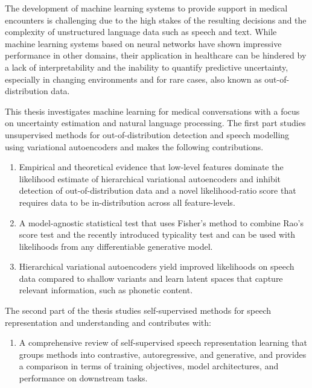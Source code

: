 The development of machine learning systems to provide support in medical encounters is challenging due to the high stakes of the resulting decisions and the complexity of unstructured language data such as speech and text. 
While machine learning systems based on neural networks have shown impressive performance in other domains, their application in healthcare can be hindered by a lack of interpretability and the inability to quantify predictive uncertainty, especially in changing environments and for rare cases, also known as out-of-distribution data.

This thesis investigates machine learning for medical conversations with a focus on uncertainty estimation and natural language processing. 
The first part studies unsupervised methods for out-of-distribution detection and speech modelling using variational autoencoders and makes the following contributions. 
%
\begin{enumerate}[label=(\roman*)] 
    \item Empirical and theoretical evidence that low-level features dominate the likelihood estimate of hierarchical variational autoencoders and inhibit detection of out-of-distribution data and a novel likelihood-ratio score that requires data to be in-distribution across all feature-levels.
    \item A model-agnostic statistical test that uses Fisher's method to combine Rao's score test and the recently introduced typicality test and can be used with likelihoods from any differentiable generative model. 
    \item Hierarchical variational autoencoders yield improved likelihoods on speech data compared to shallow variants and learn latent spaces that capture relevant information, such as phonetic content.
\end{enumerate}
%
The second part of the thesis studies self-supervised methods for speech representation and understanding and contributes with:
%
\begin{enumerate}[resume, label=(\roman*)] 
    \item A comprehensive review of self-supervised speech representation learning that groups methods into contrastive, autoregressive, and generative, and provides a comparison in terms of training objectives, model architectures, and performance on downstream tasks.
\end{enumerate}
